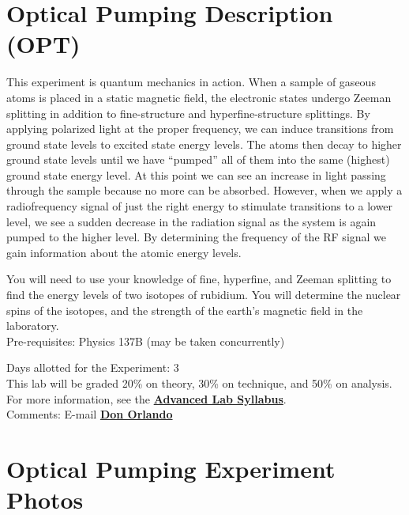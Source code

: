 \documentclass{../lab}
\begin{document}
\maketitle

\tableofcontents

\section{Optical Pumping Description (OPT)}

\newpage

This experiment is quantum mechanics in action. When a sample of gaseous atoms is placed in a static magnetic field, the electronic states undergo Zeeman splitting in addition to fine-structure and hyperfine-structure splittings. By applying polarized light at the proper frequency, we can induce transitions from ground state levels to excited state energy levels. The atoms then decay to higher ground state levels until we have ``pumped'' all of them into the same (highest) ground state energy level. At this point we can see an increase in light passing through the sample because no more can be absorbed. However, when we apply a radiofrequency signal of just the right energy to stimulate transitions to a lower level, we see a sudden decrease in the radiation signal as the system is again pumped to the higher level. By determining the frequency of the RF signal we gain information about the atomic energy levels.

You will need to use your knowledge of fine, hyperfine, and Zeeman splitting to find the energy levels of two isotopes of rubidium. You will determine the nuclear spins of the isotopes, and the strength of the earth's magnetic field in the laboratory. \\

Pre-requisites: Physics 137B (may be taken concurrently)

Days allotted for the Experiment: 3\\

This lab will be graded 20\% on theory, 30\% on technique, and 50\% on analysis. For more information, see the \href{\AdvancedLabSyllabus}{\textbf{Advanced Lab Syllabus}}. \\

Comments: E-mail \href{\MailDonOrlando}{\textbf{Don Orlando}}

\section{Optical Pumping Experiment Photos}
\end{document}
